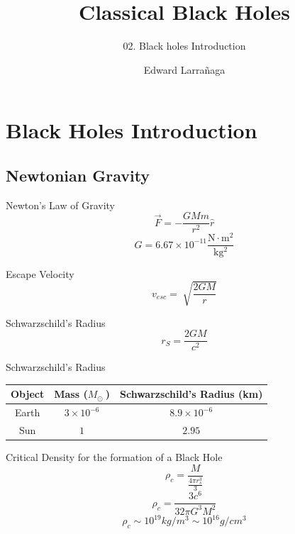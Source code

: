 \documentclass{beamer}
\title{Classical Black Holes} %
\subtitle{02. Black holes Introduction} %
\author{Edward Larra\~{n}aga}
\begin{document}
  \frame{\maketitle}

    \section{Black Holes Introduction}
    
    \subsection{Newtonian Gravity}
    	\begin{frame}{Newton's Law of Gravity}
			$$ \vec{F} = - \frac{G M m }{r^{2}} \hat{r}$$  
       		$$ G = 6.67 \times 10 ^{-11} \frac{\mathrm{N \cdot m^{2}}}{\mathrm{kg^{2}}} $$  
    	\end{frame}
        
        \begin{frame}{Escape Velocity}
        	$$ v_{esc} = \sqrt[]{\frac{2GM}{r}} $$
        \end{frame}
        
        \begin{frame}{Schwarzschild's Radius}
        	$$ r_S = \frac{2GM}{c^2} $$
        \end{frame}
        
        \begin{frame}{Schwarzschild's Radius}
        	\begin{center}
        		\begin{tabular}{c | c | c}
          		\textbf{Object}	& \textbf{Mass} ($M_\odot\ $) & \textbf{Schwarzschild's Radius} (\si{km})\\
          		\hline
          		Earth & $ 3 \times 10^{-6} $	& $8.9 \times 10^{-6}$\\ 
          		Sun 	& $ 1 $	& $2.95$                 
        		\end{tabular}    
    		\end{center}	
        \end{frame}
        
        \begin{frame}{Critical Density for the formation of a Black Hole}
        	$$ \rho_c = \frac{M}{\frac{4 \pi r_s^3}{3}}$$
            \pause
            $$ \rho_c = \frac{3c^6}{32 \pi G^3 M^2}$$
			\pause
            $$ \rho_c \sim 10^{19} \si{kg \per m^3} \sim 10^{16} \si{g \per cm^3} $$
        \end{frame}
        
\end{document}

